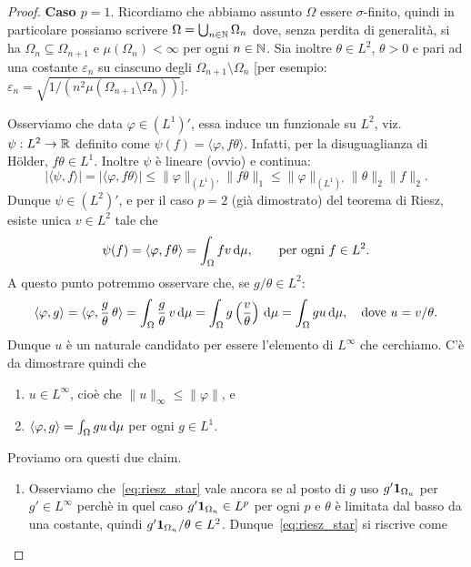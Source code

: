 \begin{proof}
	\textbf{Caso $p=1$}. Ricordiamo che abbiamo assunto $\Omega$ essere $\sigma$-finito, quindi in particolare possiamo scrivere $\Omega = \bigcup_{n \in \mathbb{N}} \Omega_n$ dove, senza perdita di generalità, si ha $\Omega_n \subseteq \Omega_{n+1}$ e $\mu(\Omega_n) < \infty$ per ogni $n \in \mathbb{N}$.
	Sia inoltre $\theta \in L^2$, $\theta > 0$ e pari ad una costante $\varepsilon_n$ su ciascuno degli $\Omega_{n+1} \setminus \Omega_n$ [per esempio: $\varepsilon_n = \sqrt{1/(n^2 \mu(\Omega_{n+1}\setminus \Omega_n))}$].

	Osserviamo che data $\varphi \in (L^1)'$, essa induce un funzionale su $L^2$, viz. $\psi : L^2 \to \mathbb{R}$ definito come $\psi(f) = \langle \varphi, f \theta \rangle$.
	Infatti, per la disuguaglianza di H\"older, $f\theta \in L^1$. Inoltre $\psi$ è lineare (ovvio) e continua:
	\begin{equation}
	\label{eq:riesz_norm}
		|\langle \psi, f \rangle|=|\langle \varphi, f\theta\rangle| \leq \|\varphi\|_{(L^1)'} \|f\theta\|_1 \leq \|\varphi\|_{(L^1)'}\|\theta\|_2\|f\|_2.
	\end{equation}
	Dunque $\psi \in (L^2)'$, e per il caso $p=2$ (già dimostrato) del teorema di Riesz, esiste unica $v \in L^2$ tale che
	\begin{equation*}
		\psi(f) = \langle \varphi, f\theta \rangle = \int_\Omega fv \,\mathrm{d}\mu, \qquad \text{per ogni $f \in L^2$}.
	\end{equation*}
	A questo punto potremmo osservare che, se $g/\theta \in L^2$:
	\begin{equation}
	\label{eq:riesz_star}
		\langle \varphi, g \rangle = \langle \varphi, \frac{g}\theta\, \theta \rangle
		= \int_\Omega \frac{g}\theta\, v \,\mathrm{d}\mu
		= \int_\Omega g \left( \frac{v}\theta \right)\,\mathrm{d}\mu
		= \int_\Omega gu\,\mathrm{d}\mu, \quad \text{dove $u = v/\theta$}.
	\end{equation}
	Dunque $u$ è un naturale candidato per essere l'elemento di $L^\infty$ che cerchiamo. C'è da dimostrare quindi che
	\begin{enumerate}
		\item $u \in L^\infty$, cioè che $\|u\|_\infty \leq \|\varphi\|$, e
		\item $\langle \varphi, g \rangle = \int_\Omega gu\,\mathrm{d}\mu$ per ogni $g \in L^1$.
	\end{enumerate}
	Proviamo ora questi due claim.
	\begin{enumerate}
		\item Osserviamo che~\eqref{eq:riesz_star} vale ancora se al posto di $g$ uso $g' {\boldsymbol{1}}_{\Omega_n}$ per $g' \in L^\infty$ perchè in quel caso $g' {\boldsymbol{1}}_{\Omega_n} \in L^p$ per ogni $p$ e $\theta$ è limitata dal basso da una costante, quindi $g' {\boldsymbol{1}}_{\Omega_n}/\theta \in L^2$. Dunque~\eqref{eq:riesz_star} si riscrive come

\end{enumerate}
\end{proof}
